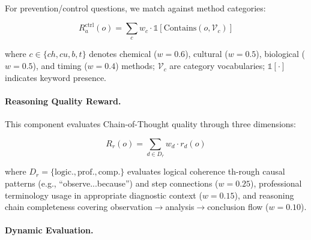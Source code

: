 \documentclass[sigconf,anonymous,review]{acmart}
\begin{document}
For prevention/control questions, we match against method categories:

\begin{equation}
R_a^{\text{ctrl}}(o) = \sum_{c} w_c \cdot \mathds{1}[\text{Contains}(o, \mathcal{V}_c)]
\label{eq:control_reward}
\end{equation}

\noindent where $c \in \{ch, cu, b, t\}$ denotes chemical ($w=0.6$), cultural ($w=0.5$), biological ($w=0.5$), and timing ($w=0.4$) methods; $\mathcal{V}_c$ are category vocabularies; $\mathds{1}[\cdot]$ indicates keyword presence.

\paragraph{Reasoning Quality Reward.}
This component evaluates Chain-of-Thought quality through three dimensions:

\begin{equation}
R_r(o) = \sum_{d \in D_r} w_d \cdot r_d(o)
\label{eq:reasoning_reward}
\end{equation}

\noindent where $D_r = \{\text{logic.}, \text{prof.}, \text{comp.}\}$ evaluates logical coherence th-rough causal patterns (e.g., ``observe...because'') and step connections ($w=0.25$), professional terminology usage in appropriate diagnostic context ($w=0.15$), and reasoning chain completeness covering observation$\rightarrow$analysis$\rightarrow$conclusion flow ($w=0.10$).

\paragraph{Dynamic Evaluation.}
\end{document}
